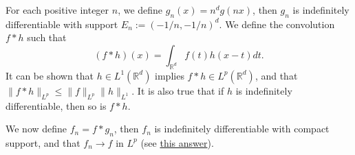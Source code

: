 \documentclass{article}
\begin{document}
\begin{enumerate}
\begin{enumerate}
\begin{solution}
            For each positive integer $n$, we define $g_n(x) = n^d g(nx)$, then $g_n$ is indefinitely differentiable with support
            $E_n := (-1/n, -1/n)^d$.
            We define the convolution $f*h$ such that
            $$(f*h)(x) = \int_{\mathbb R^d} f(t) h(x-t)dt.$$
            It can be shown that $h\in L^1(\mathbb R^d)$ implies $f*h\in L^p(\mathbb R^d)$, and that
            $\|f*h\|_{L^p}\leq \|f\|_{L^p}\|h\|_{L^1}$.
            It is also true that if $h$ is indefinitely differentiable, then so is $f*h$.

            We now define $f_n = f*g_n$, then $f_n$ is indefinitely differentiable with compact support, and that
            $f_n\to f$ in $L^p$ (see
            \href{https://math.stackexchange.com/questions/3593945/convergence-of-approximations-of-the-identity-in-lp-mathbb-rd}{this answer}).
        \end{solution}
    \end{enumerate}
\end{enumerate}
\end{document}
